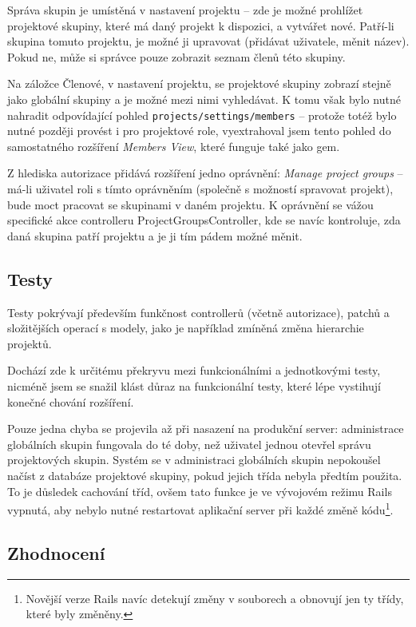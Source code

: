\documentclass[thesis=B,czech]{FITthesis}[2012/05/02]
\begin{document}
Správa skupin je umístěná v nastavení projektu -- zde je možné prohlížet
projektové skupiny, které má daný projekt k dispozici, a vytvářet nové.
Patří-li skupina tomuto projektu, je možné ji upravovat (přidávat
uživatele, měnit název). Pokud ne, může si správce pouze zobrazit seznam
členů této skupiny.

Na záložce Členové, v nastavení projektu, se projektové skupiny zobrazí
stejně jako globální skupiny a je možné mezi nimi vyhledávat. K tomu
však bylo nutné nahradit odpovídající pohled
\lstinline!projects/settings/members! -- protože totéž bylo nutné
později provést i pro projektové role, vyextrahoval jsem tento pohled do
samostatného rozšíření \emph{Members View},
které funguje také jako \gls{gem}.

Z hlediska autorizace přidává rozšíření jedno oprávnění: \emph{Manage
project groups} -- má-li uživatel roli s tímto oprávněním (společně
s možností spravovat projekt), bude moct pracovat se skupinami v daném
projektu. K oprávnění se vážou specifické akce controlleru
ProjectGroupsController, kde se navíc kontroluje, zda daná skupina patří
projektu a je ji tím pádem možné měnit.

\subsection{Testy}

Testy pokrývají především funkčnost controllerů (včetně autorizace),
patchů a složitějších operací s modely, jako je například zmíněná změna
hierarchie projektů.

Dochází zde k určitému překryvu mezi funkcionálními a jednotkovými testy, nicméně
jsem se snažil klást důraz na funkcionální testy, které lépe vystihují
konečné chování rozšíření.

Pouze jedna chyba se projevila až při nasazení na produkční server:
administrace globálních skupin fungovala do té doby, než uživatel jednou
otevřel správu projektových skupin. Systém se v administraci globálních
skupin nepokoušel načíst z databáze projektové skupiny, pokud jejich
třída nebyla předtím použita. To je důsledek cachování tříd, ovšem tato funkce je
ve vývojovém režimu Rails vypnutá, aby nebylo nutné restartovat
aplikační server při každé změně kódu\footnote{Novější verze Rails navíc
  detekují změny v souborech a obnovují jen ty třídy, které byly
  změněny.}.

\subsection{Zhodnocení}
\end{document}
